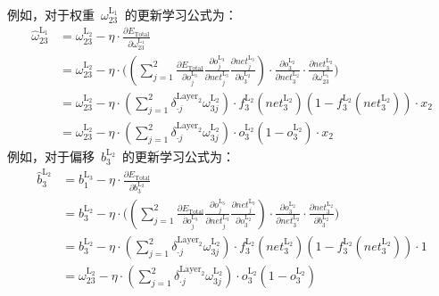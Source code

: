 \documentclass[a4paper, UTF8, heading = true, scheme = chinese, linespread = 1.66, titlepage]{ctexart}
\begin{document}
例如，对于权重~$\omega^{\text{L}_1}_{23}$~的更新学习公式为：
\begin{align}
\widehat{\omega}^{\text{L}_1}_{23} &= \omega^{\text{L}_2}_{23} - \eta \cdot \frac{\partial E_{\text{Total}}}{\partial \omega^{\text{L}_1}_{23}} \\
&= \omega^{\text{L}_2}_{23} - \eta \cdot \big((\sum_{j=1}^{2}{\frac{\partial E_{\text{Total}}}{\partial o^{\text{L}_3}_{j}} \frac{\partial o^{\text{L}_3}_{j}}{\partial net^{\text{L}_3}_j} \frac{\partial net^{\text{L}_3}_j}{\partial o^{\text{L}_2}_{3}}})  \cdot \frac{\partial o^{\text{L}_2}_{3}}{\partial net^{\text{L}_2}_3} \cdot \frac{\partial net^{\text{L}_2}_3}{\partial \omega^{\text{L}_1}_{23}}\big) \\
&= \omega^{\text{L}_2}_{23} - \eta \cdot (\sum_{j=1}^{2}{\delta^{\text{Layer}_2}_{\cdot j} \omega^{\text{L}_2}_{3j}}) \cdot f^{\text{L}_2}_{3}{(net^{\text{L}_2}_3)}(1 - f^{\text{L}_2}_{3}{(net^{\text{L}_2}_3)}) \cdot x_2 \\
&= \omega^{\text{L}_2}_{23} - \eta \cdot (\sum_{j=1}^{2}{\delta^{\text{Layer}_2}_{\cdot j} \omega^{\text{L}_2}_{3j}}) \cdot o^{\text{L}_2}_{3}(1 - o^{\text{L}_2}_{3}) \cdot x_2
\end{align}
例如，对于偏移~$b^{\text{L}_2}_{3}$~的更新学习公式为：
\begin{align}
\hat{b}^{\text{L}_2}_{3} &= b^{\text{L}_3}_{1} - \eta \cdot \frac{\partial E_{\text{Total}}}{\partial b^{\text{L}_2}_{3}} \\
&= b^{\text{L}_2}_{3} - \eta \cdot \big((\sum_{j=1}^{2}{\frac{\partial E_{\text{Total}}}{\partial o^{\text{L}_3}_{j}} \frac{\partial o^{\text{L}_3}_{j}}{\partial net^{\text{L}_3}_j} \frac{\partial net^{\text{L}_3}_j}{\partial o^{\text{L}_2}_{3}}})  \cdot \frac{\partial o^{\text{L}_2}_{3}}{\partial net^{\text{L}_2}_3} \cdot \frac{\partial net^{\text{L}_2}_3}{\partial b^{\text{L}_2}_{3}}\big) \\
&=  b^{\text{L}_2}_{3} - \eta \cdot (\sum_{j=1}^{2}{\delta^{\text{Layer}_2}_{\cdot j} \omega^{\text{L}_2}_{3j}}) \cdot f^{\text{L}_2}_{3}{(net^{\text{L}_2}_3)}(1 - f^{\text{L}_2}_{3}{(net^{\text{L}_2}_3)}) \cdot 1 \\
&= \omega^{\text{L}_2}_{23} - \eta \cdot (\sum_{j=1}^{2}{\delta^{\text{Layer}_2}_{\cdot j} \omega^{\text{L}_2}_{3j}}) \cdot o^{\text{L}_2}_{3}(1 - o^{\text{L}_2}_{3})
\end{align}
\end{document}
